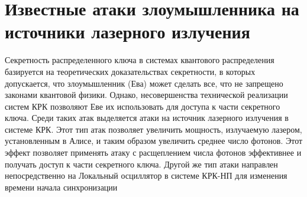\section{Известные атаки злоумышленника на источники лазерного излучения}\label{sec:ch1/sect7}
Секретность распределенного ключа в системах квантового распределения базируется на теоретических доказательствах секретности, в которых допускается, что злоумышленник (Ева) может сделать все, что не запрещено законами квантовой физики. Однако, несовершенства технической реализации систем КРК позволяют Еве их использовать для доступа к части секретного ключа. Среди таких атак выделяется атаки на источник лазерного излучения в системе КРК. Этот тип атак позволяет увеличить мощность, излучаемую лазером, установленным в Алисе, и таким образом увеличить среднее число фотонов. Этот эффект позволяет применять атаку с расщеплением числа фотонов эффективнее и получать доступ к части секретного ключа. 
\newline Другой же тип атаки направлен непосредственно на Локальный осциллятор в системе КРК-НП для изменения времени начала синхронизации
